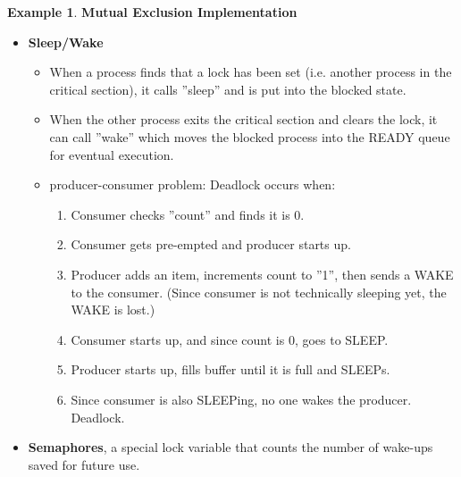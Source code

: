 \documentclass[12pt,a4paper]{article}
\theoremstyle{definition}
\newtheorem{example}{Example}[section]
\newenvironment{myitemize}
{ \begin{itemize}
    \setlength{\itemsep}{5pt}
    \setlength{\parskip}{0pt}
    \setlength{\parsep}{0pt}     }
{ \end{itemize}                  }
\newenvironment{myenumerate}
{ \begin{enumerate}
    \setlength{\itemsep}{5pt}
    \setlength{\parskip}{0pt}
    \setlength{\parsep}{0pt}     }
{ \end{enumerate}                }
\begin{document}
\begin{example}{\textbf{Mutual Exclusion Implementation}}
\begin{myitemize}
\begin{tcolorbox}
			\textsf{Busy-wait approaches like Peterson and TSL/XCHG have a problem called \textbf{deadlock}.} Consider two processes H and L, and a scheduler rule that says that H is always run when it is READY. Suppose L is currently in the critical region.
			\begin{myenumerate}
				\item H becomes ready, and L is pre-empted.
				\item H tries to obtain a lock, but cannot because L is in the critical region.
				\item H loops forever, and CPU control never gets handed to L.
				\item As a result L never releases the lock.
			\end{myenumerate}
		\end{tcolorbox}
		\item \textbf{Sleep/Wake}
		\begin{myitemize}
			\item When a process finds that a lock has been set (i.e. another process in the critical section), it calls ''sleep'' and is put into the blocked state.
			\item When the other process exits the critical section and clears the lock, it can call ''wake'' which moves the blocked process into the READY queue for eventual execution.
		\end{myitemize}
		\begin{myitemize}
			\item \textsf{producer-consumer problem}: Deadlock occurs when:
			\begin{myenumerate}
				\item Consumer checks ''count'' and finds it is 0.
				\item Consumer gets pre-empted and producer starts up.
				\item Producer adds an item, increments count to ''1'', then sends  a WAKE to the consumer. (Since consumer is not technically sleeping yet, the WAKE is lost.)
				\item Consumer starts up, and since count is 0, goes to SLEEP.
				\item Producer starts up, fills buffer until it is full and SLEEPs.
				\item Since consumer is also SLEEPing, no one wakes the producer. Deadlock.
			\end{myenumerate}
		\end{myitemize}
		\item \textbf{Semaphores}, a special lock variable that counts the number of wake-ups saved for future use.

\end{myitemize}
\end{example}
\end{document}
